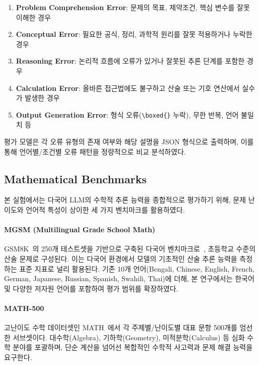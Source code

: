 \begin{enumerate}
    \item \textbf{Problem Comprehension Error}: 문제의 목표, 제약조건, 핵심 변수를 잘못 이해한 경우
    \item \textbf{Conceptual Error}: 필요한 공식, 정리, 과학적 원리를 잘못 적용하거나 누락한 경우
    \item \textbf{Reasoning Error}: 논리적 흐름에 오류가 있거나 잘못된 추론 단계를 포함한 경우
    \item \textbf{Calculation Error}: 올바른 접근법에도 불구하고 산술 또는 기호 연산에서 실수가 발생한 경우
    \item \textbf{Output Generation Error}: 형식 오류(\verb|\boxed{}| 누락), 무한 반복, 언어 불일치 등
\end{enumerate}

평가 모델은 각 오류 유형의 존재 여부와 해당 설명을 JSON 형식으로 출력하며, 이를 통해 언어별/조건별 오류 패턴을 정량적으로 비교 분석하였다.


\subsection{Mathematical Benchmarks}
본 실험에서는 다국어 LLM의 수학적 추론 능력을 종합적으로 평가하기 위해, 문제 난이도와 언어적 특성이 상이한 세 가지 벤치마크를 활용하였다.

\paragraph{MGSM (Multilingual Grade School Math)}
GSM8K~\citep{cobbe2021training}의 250개 테스트셋을 기반으로 구축된 다국어 벤치마크로~\citep{shi2022language}, 초등학교 수준의 산술 문제로 구성된다. 이는 다국어 환경에서 모델의 기초적인 산술 추론 능력을 측정하는 표준 지표로 널리 활용된다. 기존 10개 언어(Bengali, Chinese, English, French, German, Japanese, Russian, Spanish, Swahili, Thai)에 더해, 본 연구에서는 한국어 및 다양한 저자원 언어를 포함하여 평가 범위를 확장하였다.

\paragraph{MATH-500}
고난이도 수학 데이터셋인 MATH~\citep{hendrycks2measuring}에서 각 주제별/난이도별 대표 문항 500개를 엄선한 서브셋이다. 대수학(Algebra), 기하학(Geometry), 미적분학(Calculus) 등 심화 수학 분야를 포괄하며, 단순 계산을 넘어선 복합적인 수학적 사고력과 문제 해결 능력을 요구한다.

